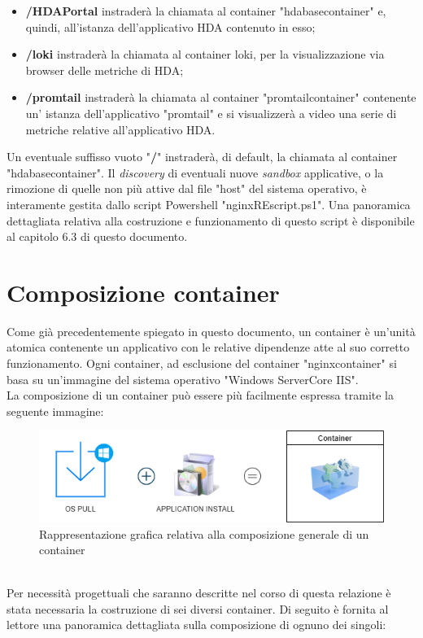 \begin{itemize}
	\item \textbf{/HDAPortal} instraderà la chiamata al container "hdabasecontainer" e, quindi, all'istanza dell'applicativo HDA contenuto in esso;
	\item \textbf{/loki} instraderà la chiamata al container loki, per la visualizzazione via browser delle metriche di HDA;
	\item \textbf{/promtail} instraderà la chiamata al container "promtailcontainer" contenente un' istanza dell'applicativo "promtail" e si visualizzerà a video una serie di metriche relative all'applicativo HDA.
\end{itemize}
Un eventuale suffisso vuoto "\textbf{/}" instraderà, di default, la chiamata al container "hdabasecontainer".
Il \textit{discovery} di eventuali nuove \textit{sandbox} applicative, o la rimozione di quelle non più attive dal file "host" del sistema operativo, è interamente gestita dallo script Powershell "nginxREscript.ps1". Una panoramica dettagliata relativa alla costruzione e funzionamento di questo script è disponibile al capitolo 6.3 di questo documento.

\section{Composizione container}
Come già precedentemente spiegato in questo documento, un container è un'unità atomica contenente un applicativo con le relative dipendenze atte al suo corretto funzionamento. Ogni container, ad esclusione del container "nginxcontainer" si basa su un'immagine del sistema operativo "Windows ServerCore IIS".\\
La composizione di un container può essere più facilmente espressa tramite la seguente immagine:
\begin{figure}[!h]     
\centering 
    \includegraphics[width=0.5\columnwidth]{immagini/img/container_structure} 
    \caption{Rappresentazione grafica relativa alla composizione generale di un container}
\end{figure} \\
Per necessità progettuali che saranno descritte nel corso di questa relazione è stata necessaria la costruzione di sei diversi container. Di seguito è fornita al lettore una panoramica dettagliata sulla composizione di ognuno dei singoli:\\


